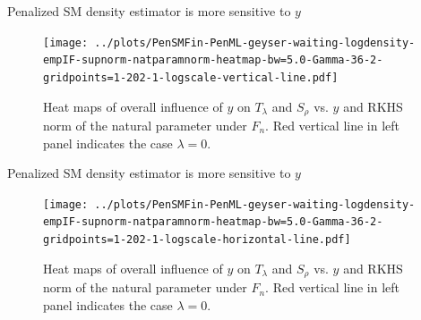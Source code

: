 \documentclass[aspectratio=169,xcolor=dvipsnames]{beamer}
\begin{document}
\begin{frame}{Penalized SM density estimator is more sensitive to $y$}

	\begin{figure}
		\centering
		\texttt{[image: ../plots/PenSMFin-PenML-geyser-waiting-logdensity-empIF-supnorm-natparamnorm-heatmap-bw=5.0-Gamma-36-2-gridpoints=1-202-1-logscale-vertical-line.pdf]}
		\caption{Heat maps of overall influence of $y$ on $T_{\lambda}$ and $S_{\rho}$ vs. $y$ and RKHS norm of the natural parameter under $F_n$. Red vertical line in left panel indicates the case $\lambda = 0$.}
	\end{figure}
	
\end{frame}


\begin{frame}{Penalized SM density estimator is more sensitive to $y$}

	\begin{figure}
		\centering
		\texttt{[image: ../plots/PenSMFin-PenML-geyser-waiting-logdensity-empIF-supnorm-natparamnorm-heatmap-bw=5.0-Gamma-36-2-gridpoints=1-202-1-logscale-horizontal-line.pdf]}
		\caption{Heat maps of overall influence of $y$ on $T_{\lambda}$ and $S_{\rho}$ vs. $y$ and RKHS norm of the natural parameter under $F_n$. Red vertical line in left panel indicates the case $\lambda = 0$.}
	\end{figure}
	
\end{frame}


%	
%		
\end{document}
